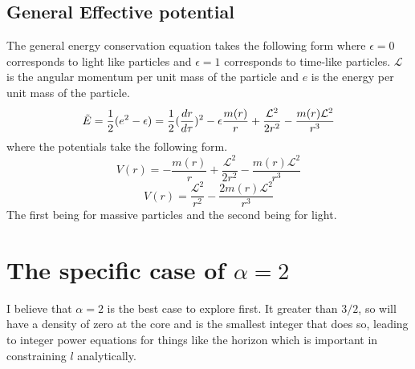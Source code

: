 \documentclass[a4paper,11pt]{article}
\begin{document}
\subsection{General Effective potential}
The general energy conservation equation takes the following form where $\epsilon = 0$ corresponds to light like particles and $\epsilon=1$ corresponds to time-like particles. $\mathcal{L}$ is the angular momentum per unit mass of the particle and $e$ is the energy per unit mass of the particle.
\begin{equation}
\Tilde{E}=\frac{1}{2}(e^2-\epsilon)=\frac{1}{2}(\frac{dr}{d\tau})^2-\epsilon \frac{m(r)}{r}+\frac{\mathcal{L}^2}{2r^2}-\frac{m(r)\mathcal{L}^2}{r^3}
\end{equation}
where the potentials take the following form. 
\begin{equation}
V(r)=-\frac{m(r)}{r}+\frac{\mathcal{L}^2}{2r^2}-\frac{m(r)\mathcal{L}^2}{r^3}
\end{equation}
\begin{equation}
V(r)=\frac{\mathcal{L}^2}{r^2}-\frac{2m(r)\mathcal{L}^2}{r^3}
\end{equation}
The first being for massive particles and the second being for light.
\section{The specific case of $\alpha = 2$}
I believe that $\alpha = 2$ is the best case to explore first. It greater than $3/2$, so will have a density of zero at the core and is the smallest integer that does so, leading to integer power equations for things like the horizon which is important in constraining $l$ analytically. 
\pagebreak
\end{document}
